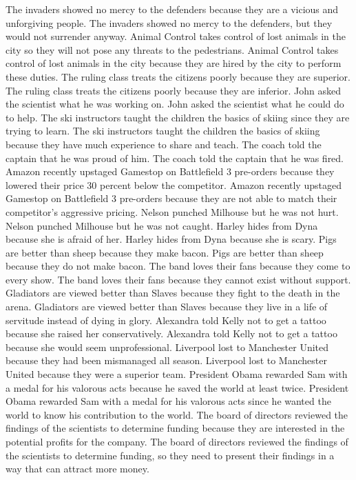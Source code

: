 \documentclass{article}
\begin{document}
\begin{enumerate}
The invaders showed no mercy to the defenders because they are a vicious and unforgiving people.
The invaders showed no mercy to the defenders, but they would not surrender anyway.
Animal Control takes control of lost animals in the city so they will not pose any threats to the pedestrians.
Animal Control takes control of lost animals in the city because they are hired by the city to perform these duties.
The ruling class treats the citizens poorly because they are superior.
The ruling class treats the citizens poorly because they are inferior.
John asked the scientist what he was working on.
John asked the scientist what he could do to help.
The ski instructors taught the children the basics of skiing since they are trying to learn.
The ski instructors taught the children the basics of skiing because they have much experience to share and teach.
The coach told the captain that he was proud of him.
The coach told the captain that he was fired.
Amazon recently upstaged Gamestop on Battlefield 3 pre-orders because they lowered their price 30 percent below the competitor.
Amazon recently upstaged Gamestop on Battlefield 3 pre-orders because they are not able to match their competitor's aggressive pricing.
Nelson punched Milhouse but he was not hurt.
Nelson punched Milhouse but he was not caught.
Harley hides from Dyna because she is afraid of her.
Harley hides from Dyna because she is scary.
Pigs are better than sheep because they make bacon.
Pigs are better than sheep because they do not make bacon.
The band loves their fans because they come to every show.
The band loves their fans because they cannot exist without support.
Gladiators are viewed better than Slaves because they fight to the death in the arena.
Gladiators are viewed better than Slaves because they live in a life of servitude instead of dying in glory.
Alexandra told Kelly not to get a tattoo because she raised her conservatively.
Alexandra told Kelly not to get a tattoo because she would seem unprofessional.
Liverpool lost to Manchester United because they had been mismanaged all season.
Liverpool lost to Manchester United because they were a superior team.
President Obama rewarded Sam with a medal for his valorous acts because he saved the world at least twice.
President Obama rewarded Sam with a medal for his valorous acts since he wanted the world to know his contribution to the world.
The board of directors reviewed the findings of the scientists to determine funding because they are interested in the potential profits for the company.
The board of directors reviewed the findings of the scientists to determine funding, so they need to present their findings in a way that can attract more money.

\end{enumerate}
\end{document}

